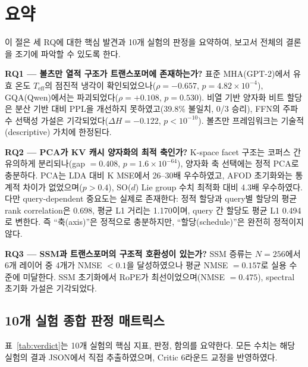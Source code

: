 \documentclass[11pt,a4paper]{article}
\newcommand{\teff}{T_\mathrm{eff}}
\begin{document}
\tableofcontents
\newpage

\section{요약}

이 절은 세 RQ에 대한 핵심 발견과 10개 실험의 판정을 요약하여, 보고서 전체의 결론을 조기에 파악할 수 있도록 한다.

\textbf{RQ1 --- 볼츠만 열적 구조가 트랜스포머에 존재하는가?}  표준 MHA(GPT-2)에서 유효 온도 $\teff$의 점진적 냉각이 확인되었으나($\rho = -0.657$, $p = 4.82 \times 10^{-4}$), GQA(Qwen)에서는 파괴되었다($\rho = +0.108$, $p = 0.530$). 비열 기반 양자화 비트 할당은 분산 기반 대비 PPL을 개선하지 못하였고(39.8\% 불일치, 0/3 승리), FFN의 주파수 선택성 가설은 기각되었다($\Delta H = -0.122$, $p < 10^{-10}$). 볼츠만 프레임워크는 기술적(descriptive) 가치에 한정된다.

\textbf{RQ2 --- PCA가 KV 캐시 양자화의 최적 축인가?}  K-space facet 구조는 코퍼스 간 유의하게 분리되나(gap $= 0.408$, $p = 1.6 \times 10^{-64}$), 양자화 축 선택에는 정적 PCA로 충분하다. PCA는 LDA 대비 K MSE에서 26--30배 우수하였고, AFOD 초기화와는 통계적 차이가 없었으며($p > 0.4$), SO($d$) Lie group 수치 최적화 대비 4.3배 우수하였다. 다만 query-dependent 중요도는 실제로 존재한다: 정적 할당과 query별 할당의 평균 rank correlation은 0.698, 평균 L1 거리는 1.170이며, query 간 할당도 평균 L1 0.494로 변한다. 즉 ``축(axis)''은 정적으로 충분하지만, ``할당(schedule)''은 완전히 정적이지 않다.

\textbf{RQ3 --- SSM과 트랜스포머의 구조적 호환성이 있는가?}  SSM 증류는 $N = 256$에서 6개 레이어 중 4개가 NMSE $< 0.1$을 달성하였으나 평균 NMSE $= 0.157$로 실용 수준에 미달한다. SSM 초기화에서 RoPE가 최선이었으며(NMSE $= 0.475$), spectral 초기화 가설은 기각되었다.

\subsection{10개 실험 종합 판정 매트릭스}

표~\ref{tab:verdict}는 10개 실험의 핵심 지표, 판정, 함의를 요약한다. 모든 수치는 해당 실험의 결과 JSON에서 직접 추출하였으며, Critic 6라운드 교정을 반영하였다.
\end{document}
